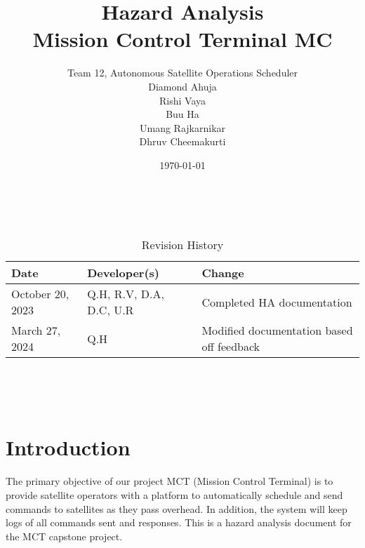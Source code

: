 \documentclass{article}
\title{Hazard Analysis \\\progname Mission Control Terminal MC}
\author{Team 12, Autonomous Satellite Operations Scheduler\\ Diamond Ahuja \\ Rishi Vaya \\ Buu Ha \\ Umang Rajkarnikar \\ Dhruv Cheemakurti}
\date{\today}
\begin{document}
\maketitle

~\newpage


\begin{table}[hp]
\caption{Revision History} \label{TblRevisionHistory}
\begin{tabularx}{\textwidth}{llX}
\toprule
\textbf{Date} & \textbf{Developer(s)} & \textbf{Change}\\
\midrule
October 20, 2023 & Q.H, R.V, D.A, D.C, U.R & Completed HA documentation\\
March 27, 2024 & Q.H & Modified documentation based off feedback \\
\bottomrule
\end{tabularx}
\end{table}

~\newpage

\tableofcontents

~\newpage



\section{Introduction}
The primary objective of our project MCT (Mission Control Terminal) is to provide satellite operators with a platform to automatically schedule and send commands to satellites as they pass overhead. In addition, the system will keep logs of all commands sent and responses. This is a hazard analysis document for the MCT capstone project.
\end{document}
